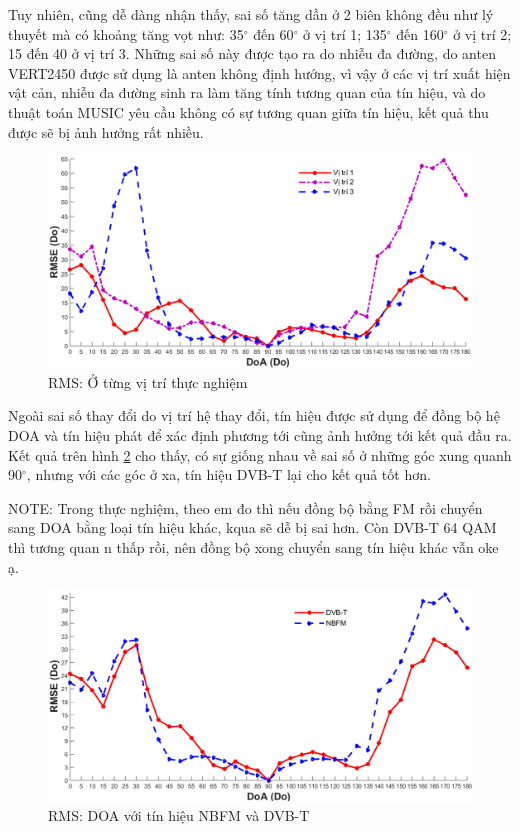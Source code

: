 {Tuy nhiên, cũng dễ dàng nhận thấy, sai số tăng dần ở 2 biên không đều như lý thuyết mà có khoảng tăng vọt như: 35$^{\circ}$ đến 60$^{\circ}$ ở vị trí 1; 135$^{\circ}$ đến 160$^{\circ}$ ở vị trí 2; 15 đến 40 ở vị trí 3. Những sai số này được tạo ra do nhiễu đa đường, do anten VERT2450 được sử dụng là anten không định hướng, vì vậy ở các vị trí xuất hiện vật cản, nhiễu đa đường sinh ra làm tăng tính tương quan của tín hiệu, và do thuật toán MUSIC yêu cầu không có sự tương quan giữa tín hiệu, kết quả thu được sẽ bị ảnh hưởng rất nhiều.
\begin{figure} [!h]
	\centering
	\includegraphics[width=1\linewidth]{figures/dvbt_1.png}
	\caption{RMS: Ở từng vị trí thực nghiệm}
	\label{fig:dvbt_1}
\end{figure}

Ngoài sai số thay đổi do vị trí hệ thay đổi, tín hiệu được sử dụng để đồng bộ hệ DOA và tín hiệu phát để xác định phương tới cũng ảnh hưởng tới kết quả đầu ra. Kết quả trên hình \ref{fig:dvbt_3} cho thấy, có sự giống nhau về sai số ở những góc xung quanh 90$^{\circ}$, nhưng với các góc ở xa, tín hiệu DVB-T lại cho kết quả tốt hơn.

NOTE: Trong thực nghiệm, theo em đo thì nếu đồng bộ bằng FM rồi chuyển sang DOA bằng loại tín hiệu khác, kqua sẽ dễ bị sai hơn. Còn DVB-T 64 QAM thì tương quan n thấp rồi, nên đồng bộ xong chuyển sang tín hiệu khác vẫn oke ạ.
\begin{figure} [!h]
	\centering
	\includegraphics[width=1\linewidth]{figures/dvbt_3.png}
	\caption{RMS: DOA với tín hiệu NBFM và DVB-T}
	\label{fig:dvbt_3}
\end{figure}

}

